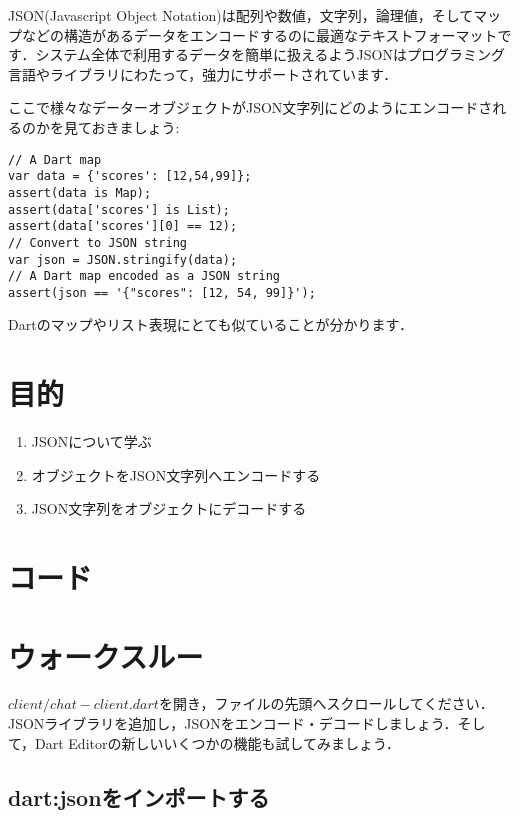 
JSON(Javascript Object Notation)は配列や数値，文字列，論理値，そしてマップなどの構造があるデータをエンコードするのに最適なテキストフォーマットです．システム全体で利用するデータを簡単に扱えるようJSONはプログラミング言語やライブラリにわたって，強力にサポートされています．

ここで様々なデーターオブジェクトがJSON文字列にどのようにエンコードされるのかを見ておきましょう:

\begin{verbatim}
// A Dart map
var data = {'scores': [12,54,99]};
assert(data is Map);
assert(data['scores'] is List);
assert(data['scores'][0] == 12);
// Convert to JSON string
var json = JSON.stringify(data);
// A Dart map encoded as a JSON string
assert(json == '{"scores": [12, 54, 99]}');
\end{verbatim}

Dartのマップやリスト表現にとても似ていることが分かります．

\section{目的}

\begin{enumerate}
\item JSONについて学ぶ
\item オブジェクトをJSON文字列へエンコードする
\item JSON文字列をオブジェクトにデコードする
\end{enumerate}

\section{コード}


\section{ウォークスルー}

$ client/chat-client.dart $を開き，ファイルの先頭へスクロールしてください．JSONライブラリを追加し，JSONをエンコード・デコードしましょう．そして，Dart Editorの新しいいくつかの機能も試してみましょう．

\subsection{dart:jsonをインポートする}

